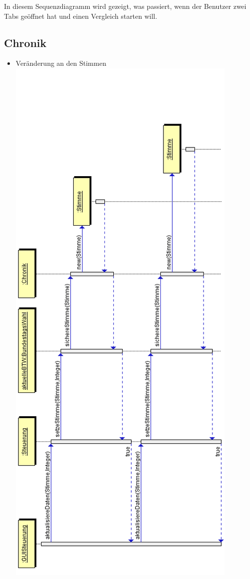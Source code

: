 \documentclass[12pt,a4paper,titlepage]{article}
\begin{document}
In diesem Sequenzdiagramm wird gezeigt, was passiert, wenn der Benutzer zwei Tabs geöffnet hat und einen Vergleich starten will.

\subsection{Chronik}
\begin{itemize}
	\item Veränderung an den Stimmen \\
		\includegraphics[scale=0.7]{Chronik_Sequenzdiagramm-stimmenaendern.png}

\end{itemize}
\end{document}
